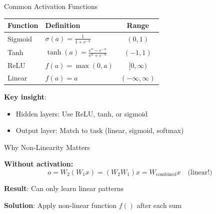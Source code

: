 \documentclass[aspectratio=169]{beamer}\usepackage[]{graphicx}\usepackage[]{xcolor}
\begin{document}
\begin{frame}{Common Activation Functions}

\begin{center}
\small
\begin{tabular}{llc}
\toprule
\textbf{Function} & \textbf{Definition} & \textbf{Range} \\
\midrule
Sigmoid & $\sigma(a) = \frac{1}{1+e^{-a}}$ & $(0, 1)$ \\
Tanh & $\tanh(a) = \frac{e^a - e^{-a}}{e^a + e^{-a}}$ & $(-1, 1)$ \\
ReLU & $f(a) = \max(0, a)$ & $[0, \infty)$ \\
Linear & $f(a) = a$ & $(-\infty, \infty)$ \\
\bottomrule
\end{tabular}
\end{center}

\vfill

\textbf{Key insight}:
\begin{itemize}
    \item Hidden layers: Use ReLU, tanh, or sigmoid
    \item Output layer: Match to task (linear, sigmoid, softmax)
\end{itemize}

\end{frame}


\begin{frame}{Why Non-Linearity Matters}

\textbf{Without activation:}
\[
o = W_2(W_1 x) = (W_2 W_1) x = W_{\text{combined}} x \quad \text{(linear!)}
\]

\vfill
\textbf{Result}: Can only learn linear patterns

\vfill
\textbf{Solution}: Apply non-linear function $f()$ after each sum

\end{frame}
\end{document}
